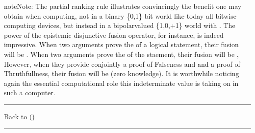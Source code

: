 \documentclass[a4paper,12pt,english]{sphinxhowto}
\begin{document}
\begin{sphinxadmonition}{note}{Note:}
\sphinxAtStartPar
The partial  ranking rule illustrates convincingly the benefit one may obtain when computing, not in a binary \{0,1\} bit world like today all bit\sphinxhyphen{}wise computing devices, but instead in a bipolar\sphinxhyphen{}valued \{\sphinxhyphen{}1,0,+1\} world with . The power of the epistemic disjunctive fusion operator, for instance, is indeed impressive. When two arguments prove the  of a logical statement, their fusion will be . When two arguments prove the  of the staement, their fusion will be , However, when they provide conjointly a proof of Falseness and and a proof of Thruthfullness, their fusion will be  (zero knowledge). It is worthwhile noticing again the essential computational role this indeterminate  value is taking on in such a  computer.
\end{sphinxadmonition}


\bigskip\hrule\bigskip


\sphinxAtStartPar
Back to {\hyperref[\detokenize{pearls:pearls-label}]{}} ()


\bigskip\hrule\bigskip
\end{document}
